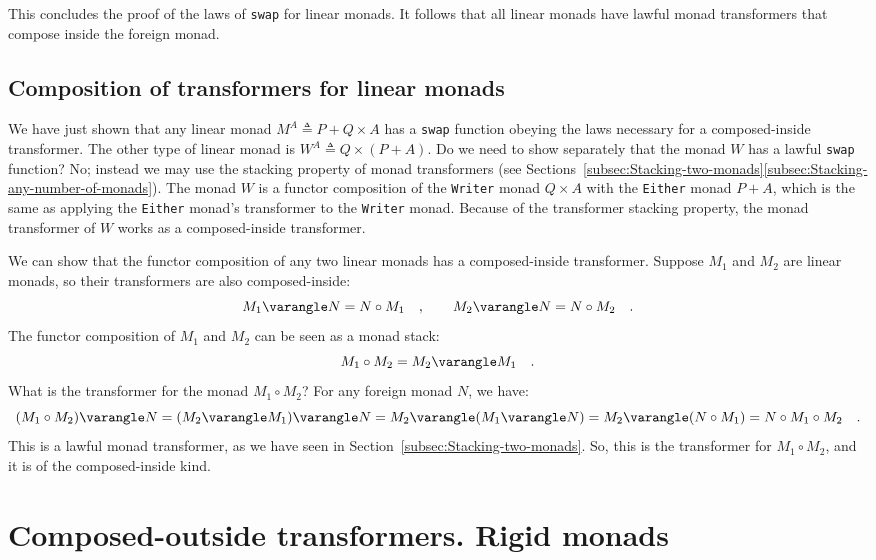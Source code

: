 This concludes the proof of the laws of \lstinline!swap! for linear
monads. It follows that all linear monads have lawful monad transformers
that compose inside the foreign monad.

\subsection{Composition of transformers for linear monads}

We have just shown that any linear monad $M^{A}\triangleq P+Q\times A$
has a \lstinline!swap! function obeying the laws necessary for a
composed-inside transformer. The other type of linear monad is $W^{A}\triangleq Q\times\left(P+A\right)$.
Do we need to show separately that the monad $W$ has a lawful \lstinline!swap!
function? No; instead we may use the stacking property of monad transformers
(see Sections~\ref{subsec:Stacking-two-monads}\textendash \ref{subsec:Stacking-any-number-of-monads}).
The monad $W$ is a functor composition of the \lstinline!Writer!
monad $Q\times A$ with the \lstinline!Either! monad $P+A$, which
is the same as applying the \lstinline!Either! monad\textsf{'}s transformer
to the \lstinline!Writer! monad. Because of the transformer stacking
property, the monad transformer of $W$ works as a composed-inside
transformer.

We can show that the functor composition of any two linear monads
has a composed-inside transformer. Suppose $M_{1}$ and $M_{2}$ are
linear monads, so their transformers are also composed-inside:
\[
M_{1}\varangle N=N\circ M_{1}\quad,\quad\quad M_{2}\varangle N=N\circ M_{2}\quad.
\]
The functor composition of $M_{1}$ and $M_{2}$ can be seen as a
monad stack:
\[
M_{1}\circ M_{2}=M_{2}\varangle M_{1}\quad.
\]
What is the transformer for the monad $M_{1}\circ M_{2}$? For any
foreign monad $N$, we have:
\[
(M_{1}\circ M_{2})\varangle N=(M_{2}\varangle M_{1})\varangle N=M_{2}\varangle(M_{1}\varangle N)=M_{2}\varangle(N\circ M_{1})=N\circ M_{1}\circ M_{2}\quad.
\]
This is a lawful monad transformer, as we have seen in Section~\ref{subsec:Stacking-two-monads}.
So, this is the transformer for $M_{1}\circ M_{2}$, and it is of
the composed-inside kind.

\section{Composed-outside transformers. Rigid monads\label{sec:transformers-rigid-monads}}

